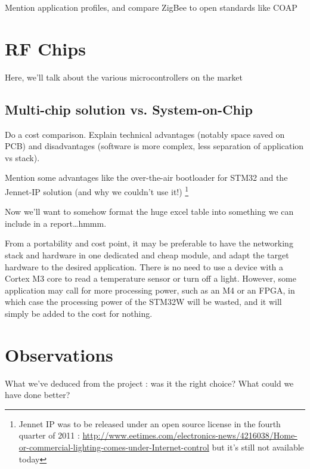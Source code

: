 Mention application profiles, and compare ZigBee to open standards like COAP


\section{RF Chips}\label{sec:chips}

Here, we'll talk about the various microcontrollers on the market

\subsection{Multi-chip solution vs. System-on-Chip}

Do a cost comparison. 
Explain technical advantages (notably space saved on PCB) and disadvantages
(software is more complex, less separation of application vs stack).

Mention some advantages like the over-the-air bootloader for STM32 and the
Jennet-IP solution (and why we couldn't use it!) \footnote{Jennet IP was to be
released under an open source license in the fourth quarter of 2011
: \url{http://www.eetimes.com/electronics-news/4216038/Home-or-commercial-lighting-comes-under-Internet-control}
but it's still not available today}

Now we'll want to somehow format the huge excel table into something we can
include in a report\ldots hmmm.


From a portability and cost point, it may be preferable to have the networking
stack and hardware in one dedicated and cheap module, and adapt the target
hardware to the desired application. There is no need to use a device with
a Cortex M3 core to read a temperature sensor or turn off a light. However, some
application may call for more processing power, such as an M4 or an FPGA, in
which case the processing power of the STM32W will be wasted, and it will simply
be added to the cost for nothing.

\section{Observations}

What we've deduced from the project : was it the right choice? What could we
have done better?


